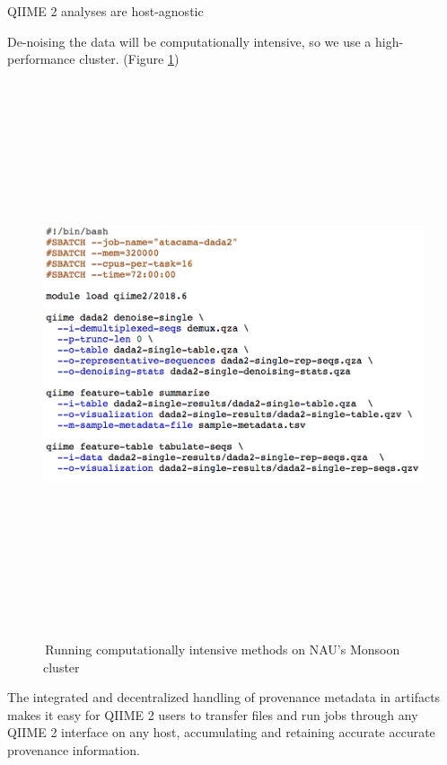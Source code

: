 \documentclass[final]{beamer}
\newlength{\colwidth}
\begin{document}
\begin{frame}[t]
\begin{columns}[t]
\begin{column}{\colwidth}
  \begin{block}{QIIME 2 analyses are host-agnostic}

    De-noising the data will be computationally intensive, so we use a
    high-performance cluster. (Figure \ref{fig:dada2})

    \begin{figure}[tph!]
      {\includegraphics[height=16cm]{assets/HPC_Analysis}}
      \caption{\,Running computationally intensive methods on NAU's Monsoon cluster}
      \label{fig:dada2}
    \end{figure}

    \begin{tcolorbox}
    [width=\textwidth, colframe=blue]
    {The integrated and decentralized handling of provenance metadata in
    artifacts makes it easy for QIIME 2 users to transfer files and run jobs
    through any QIIME 2 interface on any host, accumulating and retaining
    accurate accurate provenance information}.
  \end{tcolorbox}

  \end{block}


\end{column}
\end{columns}
\end{frame}
\end{document}
